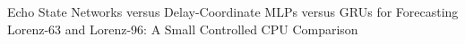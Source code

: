 Echo State Networks versus Delay-Coordinate MLPs versus GRUs for Forecasting Lorenz-63 and Lorenz-96: A Small Controlled CPU Comparison
